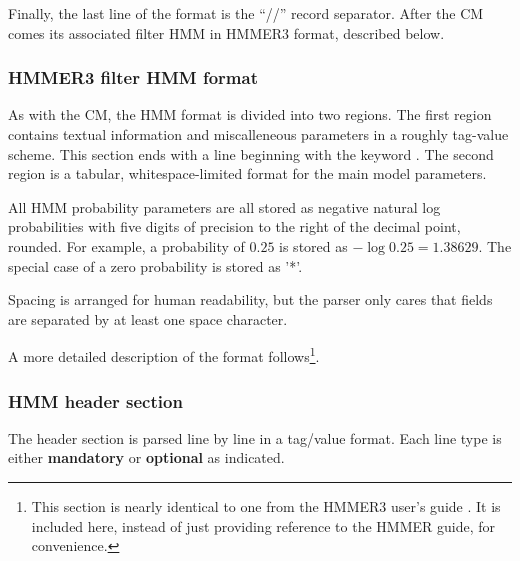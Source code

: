   Finally, the last line of the format is the ``//'' record separator.
  After the CM comes its associated filter HMM in HMMER3 format,
  described below.

\subsubsection{HMMER3 filter HMM format}

As with the CM, the HMM format is divided into two regions. The first
region contains textual information and miscalleneous parameters in a
roughly tag-value scheme.  This section ends with a line beginning
with the keyword . The second region is a tabular,
whitespace-limited format for the main model parameters.

All HMM probability parameters are all stored as negative natural log
probabilities with five digits of precision to the right of the
decimal point, rounded. For example, a probability of $0.25$ is stored
as $-\log 0.25 = 1.38629$. The special case of a zero probability is
stored as '*'.

Spacing is arranged for human readability, but the parser only cares
that fields are separated by at least one space character.

A more detailed description of the format follows\footnote{This section is
  nearly identical to one from the HMMER3 user's guide
  \cite{hmmer3guide}. It is included here, instead of just providing
  reference to the HMMER guide, for convenience.}.

\subsubsection{HMM header section}

The header section is parsed line by line in a tag/value format. Each
line type is either \textbf{mandatory} or \textbf{optional} as
indicated. 

